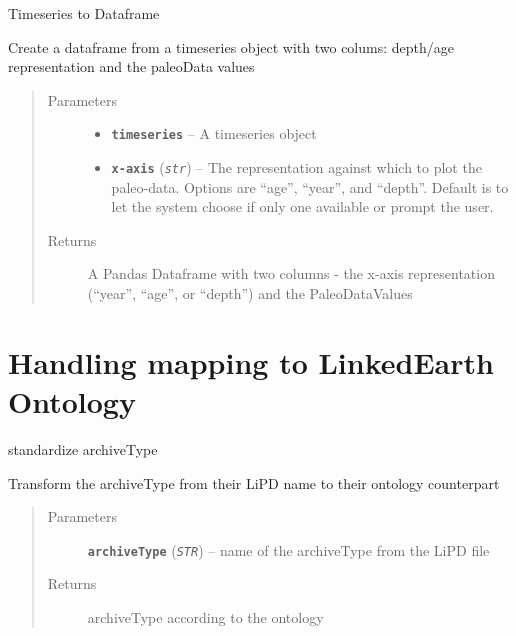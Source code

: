\documentclass[letterpaper,10pt,english]{sphinxmanual}
\begin{document}
\begin{fulllineitems}
\label{LIPDutils:pyleoclim.TsToDf}
Timeseries to Dataframe

Create a dataframe from a timeseries object with two colums:
depth/age representation and the paleoData values
\begin{quote}\begin{description}
\item[{Parameters}] \leavevmode\begin{itemize}
\item {} 
\textbf{\texttt{timeseries}} -- A timeseries object

\item {} 
\textbf{\texttt{x-axis}} (\emph{\texttt{str}}) -- The representation against which to plot the paleo-data.
Options are ``age'', ``year'', and ``depth''. Default is to let the
system choose if only one available or prompt the user.

\end{itemize}

\item[{Returns}] \leavevmode
A Pandas Dataframe with two columns - the x-axis representation
(``year'', ``age'', or ``depth'') and the PaleoDataValues

\end{description}\end{quote}

\end{fulllineitems}



\section{Handling mapping to LinkedEarth Ontology}
\label{LIPDutils:handling-mapping-to-linkedearth-ontology}

\begin{fulllineitems}
\label{LIPDutils:pyleoclim.LipdToOntology}
standardize archiveType

Transform the archiveType from their LiPD name to their ontology counterpart
\begin{quote}\begin{description}
\item[{Parameters}] \leavevmode
\textbf{\texttt{archiveType}} (\emph{\texttt{STR}}) -- name of the archiveType from the LiPD file

\item[{Returns}] \leavevmode
archiveType according to the ontology

\end{description}\end{quote}

\end{fulllineitems}
\end{document}
